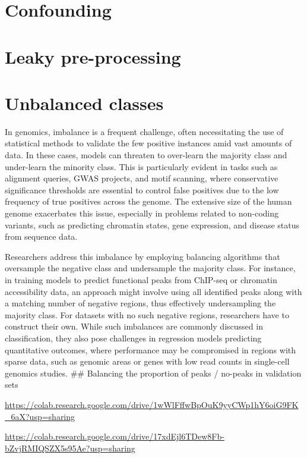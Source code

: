 \documentclass[
]{book}
\begin{document}
\section{Confounding}\label{confounding}

\section{Leaky pre-processing}\label{leaky-pre-processing}

\section{Unbalanced classes}\label{unbalanced-classes}

In genomics, imbalance is a frequent challenge, often necessitating the use of statistical methods to validate the few positive instances amid vast amounts of data. In these cases, models can threaten to over-learn the majority class and under-learn the minority class. This is particularly evident in tasks such as alignment queries, GWAS projects, and motif scanning, where conservative significance thresholds are essential to control false positives due to the low frequency of true positives across the genome. The extensive size of the human genome exacerbates this issue, especially in problems related to non-coding variants, such as predicting chromatin states, gene expression, and disease status from sequence data.

Researchers address this imbalance by employing balancing algorithms that oversample the negative class and undersample the majority class. For instance, in training models to predict functional peaks from ChIP-seq or chromatin accessibility data, an approach might involve using all identified peaks along with a matching number of negative regions, thus effectively undersampling the majority class. For datasets with no such negative regions, researchers have to construct their own. While such imbalances are commonly discussed in classification, they also pose challenges in regression models predicting quantitative outcomes, where performance may be compromised in regions with sparse data, such as genomic areas or genes with low read counts in single-cell genomics studies.
\#\# Balancing the proportion of peaks / no-peaks in validation sets

\url{https://colab.research.google.com/drive/1wWlFffwBpOuK9yyCWp1hY6oiG9FK_6aX?usp=sharing}

\url{https://colab.research.google.com/drive/17xdEjl6TDew8Fb-bZvjRMIQSZX5s95Ae?usp=sharing}
\end{document}
